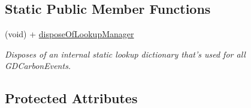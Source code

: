 \subsection*{Static Public Member Functions}
\begin{DoxyCompactItemize}
\item 
(void) + \hyperlink{interface_g_d_carbon_event_aa9b7f189c2fdbe7d0424803cd3e7f936}{disposeOfLookupManager}
\begin{DoxyCompactList}\small\item\em Disposes of an internal static lookup dictionary that's used for all GDCarbonEvents. \item\end{DoxyCompactList}\end{DoxyCompactItemize}
\subsection*{Protected Attributes}
